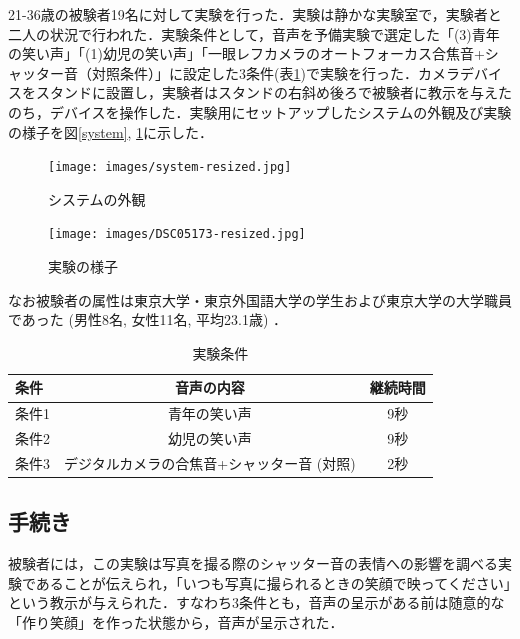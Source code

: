 \documentclass[submit,techreq]{ec2014}
\begin{document}
21-36歳の被験者19名に対して実験を行った．実験は静かな実験室で，実験者と二人の状況で行われた．実験条件として，音声を予備実験で選定した「(3)青年の笑い声」「(1)幼児の笑い声」「一眼レフカメラのオートフォーカス合焦音+シャッター音（対照条件）」に設定した3条件(表\ref{cond5})で実験を行った．カメラデバイスをスタンドに設置し，実験者はスタンドの右斜め後ろで被験者に教示を与えたのち，デバイスを操作した．実験用にセットアップしたシステムの外観及び実験の様子を図\ref{system}, \ref{yousu}に示した．

\begin{figure}[h!]
\begin{minipage}{0.49\columnwidth}
\begin{center}
\texttt{[image: images/system-resized.jpg]}
\end{center}
\caption{システムの外観}
  \label{system}
\end{minipage}
\begin{minipage}{0.49\columnwidth}
\begin{center}
\texttt{[image: images/DSC05173-resized.jpg]}
\end{center}
\caption{実験の様子}
  \label{yousu}
\end{minipage}
\end{figure}

\break

なお被験者の属性は東京大学・東京外国語大学の学生および東京大学の大学職員であった (男性8名, 女性11名, 平均23.1歳) ．
\begin{table}[htb]
  \begin{center}
    \caption{実験条件}
    \label{cond5}
    \begin{tabular}{|l|c|c|} \hline
      条件 & 音声の内容 & 継続時間 \\ \hline  \hline
      条件1 & 青年の笑い声 & 9秒\\ \hline 
      条件2 & 幼児の笑い声 & 9秒 \\ \hline
      条件3 & デジタルカメラの合焦音+シャッター音 (対照) & 2秒 \\ \hline
    \end{tabular}
  \end{center}
\end{table}




\subsection{手続き}
\label{手続き}

被験者には，この実験は写真を撮る際のシャッター音の表情への影響を調べる実験であることが伝えられ，「いつも写真に撮られるときの笑顔で映ってください」という教示が与えられた．すなわち3条件とも，音声の呈示がある前は随意的な「作り笑顔」を作った状態から，音声が呈示された．
\end{document}
